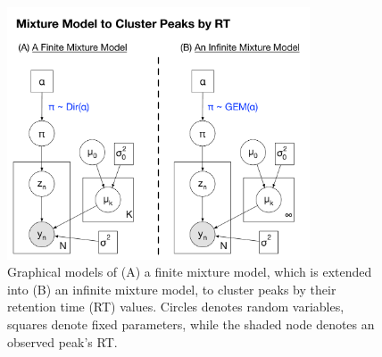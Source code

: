 \begin{figure}[tbh!]
\noindent \begin{centering}
\includegraphics[width=0.8\textwidth]{03-machine-learning/figures/mixture_model.pdf}
\par\end{centering}
\caption[Graphical models of (A) a finite mixture model, which is extended into (B) an infinite mixture model, to cluster peaks by their retention time (RT) values.]{\label{fig:background-mixture-plate-diagram}Graphical models of (A) a finite mixture model, which is extended into (B) an infinite mixture model, to cluster peaks by their retention time (RT) values. Circles denotes random variables, squares denote fixed parameters, while the shaded node denotes an observed peak's RT.}
\end{figure}

